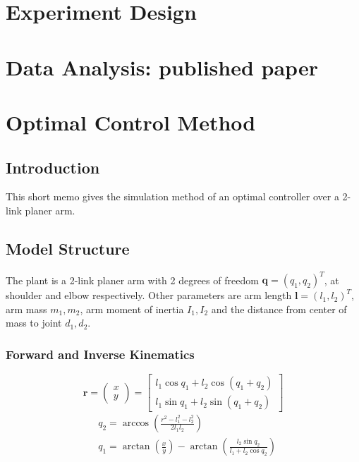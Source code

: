 \section{Experiment Design}
\section{Data Analysis: published paper}
\section{Optimal Control Method}

\subsection{Introduction}
This short memo gives the simulation method of an optimal controller over a 2-link planer arm.


\subsection{Model Structure}\label{model-struct}
The plant is a 2-link planer arm with 2 degrees of freedom $\bm{q} = (q_1, q_2)^T$, at shoulder and elbow respectively. Other parameters are arm length $\bm{l} = (l_1, l_2)^T$, arm mass $m_1, m_2$, arm moment of inertia $I_1, I_2$ and the distance from center of mass to joint $d_1,d_2$.

\subsubsection{Forward and Inverse Kinematics}
\begin{equation}
	\bm{r} =\left(\begin{matrix} x\\y \end{matrix}\right) %
	= \left[ \begin{matrix}  l_1\cos{q_1} + l_2\cos{(q_1+q_2)} \\ l_1\sin{q_1} + l_2\sin{(q_1+q_2)}  \end{matrix} \right]
\end{equation}
\begin{equation}
	\begin{split}
	& q_2 = \arccos{\left(\frac{r^2-l_1^2-l_2^2}{2l_1l_2}\right)} \\
	& q_1 = \arctan{\left( \frac{x}{y} \right)} - \arctan{\left(\frac{l_2\sin{q_2}}{l_1+l_2\cos q_2 }\right)}
	\end{split}
\end{equation}

